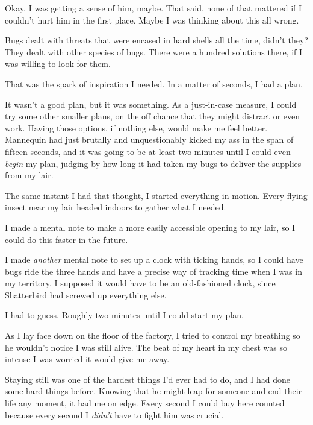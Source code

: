 Okay.  I was getting a sense of him, maybe.  That said, none of that mattered if I couldn't hurt him in the first place.  Maybe I was thinking about this all wrong.



Bugs dealt with threats that were encased in hard shells all the time, didn't they?  They dealt with other species of bugs.  There were a hundred solutions there, if I was willing to look for them.



That was the spark of inspiration I needed.  In a matter of seconds, I had a plan.



It wasn't a good plan, but it was something.  As a just-in-case measure, I could try some other smaller plans, on the off chance that they might distract or even work.  Having those options, if nothing else, would make me feel better.  Mannequin had just brutally and unquestionably kicked my ass in the span of fifteen seconds, and it was going to be at least two minutes until I could even\emph{ begin} my plan, judging by how long it had taken my bugs to deliver the supplies from my lair.



The same instant I had that thought, I started everything in motion.  Every flying insect near my lair headed indoors to gather what I needed.



I made a mental note to make a more easily accessible opening to my lair, so I could do this faster in the future.



I made \emph{another} mental note to set up a clock with ticking hands, so I could have bugs ride the three hands and have a precise way of tracking time when I was in my territory.  I supposed it would have to be an old-fashioned clock, since Shatterbird had screwed up everything else.



I had to guess.  Roughly two minutes until I could start my plan.



As I lay face down on the floor of the factory, I tried to control my breathing so he wouldn't notice I was still alive.  The beat of my heart in my chest was so intense I was worried it would give me away.



Staying still was one of the hardest things I'd ever had to do, and I had done some hard things before.  Knowing that he might leap for someone and end their life any moment, it had me on edge.  Every second I could buy here counted because every second I \emph{didn't} have to fight him was crucial.




